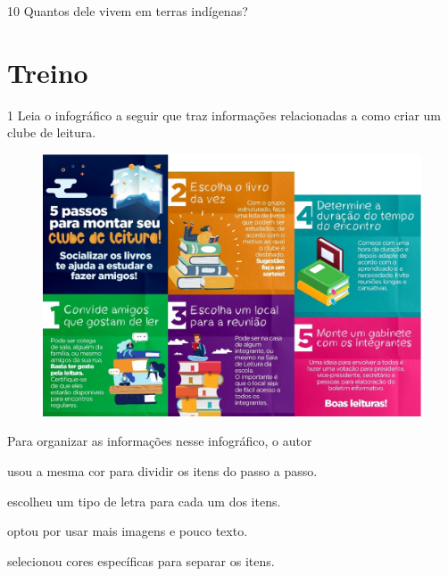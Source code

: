 
\num{10} Quantos dele vivem em terras indígenas?


\section*{Treino}

\num{1} Leia o infográfico a seguir que traz informações relacionadas a
como criar um clube de leitura.

\begin{figure}[htpb!]
\centering
\includegraphics[width=.8\textwidth]{media/image32.png}
\end{figure}


Para organizar as informações nesse infográfico, o autor

\begin{escolha}
\item usou a mesma cor para dividir os itens do passo a passo.

\item escolheu um tipo de letra para cada um dos itens.

\item optou por usar mais imagens e pouco texto.

\item selecionou cores específicas para separar os itens.
\end{escolha}

